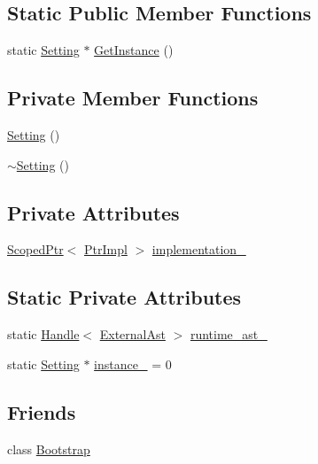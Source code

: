 \subsection*{Static Public Member Functions}
\begin{DoxyCompactItemize}
\item 
static \hyperlink{classmocha_1_1_setting}{Setting} $\ast$ \hyperlink{classmocha_1_1_setting_a8fa3504351b20fd3c0dc27b664b53bd9}{GetInstance} ()
\end{DoxyCompactItemize}
\subsection*{Private Member Functions}
\begin{DoxyCompactItemize}
\item 
\hyperlink{classmocha_1_1_setting_a63d0638ba8374c025939c795fae693fb}{Setting} ()
\item 
\hyperlink{classmocha_1_1_setting_aae4a6f95334a30ec6e9b673161fe8bb6}{$\sim$Setting} ()
\end{DoxyCompactItemize}
\subsection*{Private Attributes}
\begin{DoxyCompactItemize}
\item 
\hyperlink{classmocha_1_1_scoped_ptr}{ScopedPtr}$<$ \hyperlink{classmocha_1_1_setting_1_1_ptr_impl}{PtrImpl} $>$ \hyperlink{classmocha_1_1_setting_a07d6568a1ff8ac8a969d5c3c3b6ba6fe}{implementation\_\-}
\end{DoxyCompactItemize}
\subsection*{Static Private Attributes}
\begin{DoxyCompactItemize}
\item 
static \hyperlink{classmocha_1_1_handle}{Handle}$<$ \hyperlink{classmocha_1_1_external_ast}{ExternalAst} $>$ \hyperlink{classmocha_1_1_setting_a5cb9c6885050b289f78e040839bb6e65}{runtime\_\-ast\_\-}
\item 
static \hyperlink{classmocha_1_1_setting}{Setting} $\ast$ \hyperlink{classmocha_1_1_setting_a37e8e9f7b64d857acf07758852747961}{instance\_\-} = 0
\end{DoxyCompactItemize}
\subsection*{Friends}
\begin{DoxyCompactItemize}
\item 
class \hyperlink{classmocha_1_1_setting_aa966551cf4c3c99d5e0da9175856fb7e}{Bootstrap}
\end{DoxyCompactItemize}


